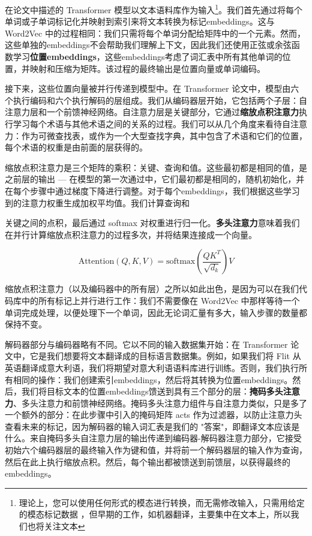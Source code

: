 \documentclass[Chinese, 11pt, table]{diazessay} %
\begin{document}
\begin{CJK}{UTF8}{gbsn}
\begin{sloppypar}
在论文中描述的 Transformer 模型以文本语料库作为输入\footnote{理论上，您可以使用任何形式的模态进行转换，而无需修改输入，只需用给定的模态标记数据 \citep{xu2023multimodal}，但早期的工作，如机器翻译，主要集中在文本上，所以我们也将关注文本}。我们首先通过将每个单词或子单词标记化并映射到索引来将文本转换为标记embeddings。这与 Word2Vec 中的过程相同：我们只需将每个单词分配给矩阵中的一个元素。然而，这些单独的embeddings不会帮助我们理解上下文，因此我们还使用正弦或余弦函数学习\textbf{位置embeddings}，这些embeddings考虑了词汇表中所有其他单词的位置，并映射和压缩为矩阵。该过程的最终输出是位置向量或单词编码。

接下来，这些位置向量被并行传递到模型中。在 Transformer 论文中，模型由六个执行编码和六个执行解码的层组成。我们从编码器层开始，它包括两个子层：自注意力层和一个前馈神经网络。自注意力层是关键部分，它通过\textbf{缩放点积注意力}执行学习每个术语与其他术语之间的关系的过程。我们可以从几个角度来看待自注意力：作为可微查找表，或作为一个大型查找字典，其中包含了术语和它们的位置，每个术语的权重是由前面的层获得的。

缩放点积注意力是三个矩阵的乘积：关键、查询和值。这些最初都是相同的值，是之前层的输出 --- 在模型的第一次通过中，它们最初都是相同的，随机初始化，并在每个步骤中通过梯度下降进行调整。对于每个embeddings，我们根据这些学习到的注意力权重生成加权平均值。我们计算查询和

关键之间的点积，最后通过 softmax 对权重进行归一化。\textbf{多头注意力}意味着我们在并行计算缩放点积注意力的过程多次，并将结果连接成一个向量。

\begin{equation}
\text{Attention}(Q, K, V) = \text{softmax}\left(\frac{QK^T}{\sqrt{d_k}}\right)V
\end{equation}

缩放点积注意力（以及编码器中的所有层）之所以如此出色，是因为可以在我们代码库中的所有标记上并行进行工作：我们不需要像在 Word2Vec 中那样等待一个单词完成处理，以便处理下一个单词，因此无论词汇量有多大，输入步骤的数量都保持不变。

解码器部分与编码器略有不同。它以不同的输入数据集开始：在 Transformer 论文中，它是我们想要将文本翻译成的目标语言数据集。例如，如果我们将 Flit 从英语翻译成意大利语，我们将期望对意大利语语料库进行训练。否则，我们执行所有相同的操作：我们创建索引embeddings，然后将其转换为位置embeddings。然后，我们将目标文本的位置embeddings馈送到具有三个部分的层：\textbf{掩码多头注意力}、多头注意力和前馈神经网络。掩码多头注意力组件与自注意力类似，只是多了一个额外的部分：在此步骤中引入的掩码矩阵 acts 作为过滤器，以防止注意力头查看未来的标记，因为解码器的输入词汇表是我们的 "答案"，即翻译文本应该是什么。来自掩码多头自注意力层的输出传递到编码器-解码器注意力部分，它接受初始六个编码器层的最终输入作为键和值，并将前一个解码器层的输入作为查询，然后在此上执行缩放点积。然后，每个输出都被馈送到前馈层，以获得最终的embeddings。


\end{sloppypar}
\end{CJK}
\end{document}
